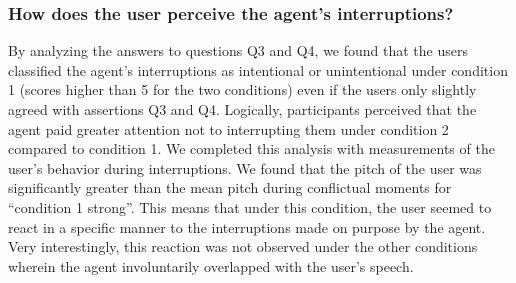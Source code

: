 \documentclass[twocolumn]{svjour3}
\begin{document}
\begin{table}
\centering
{}
\caption{Mean agreements of the participants for conditions 1 and condition 2 (translated from French).}
\label{Answers}
\end{table}

\subsubsection{How does the user perceive the agent's interruptions?}

By analyzing the answers to questions Q3 and Q4, we found that the users classified the agent's interruptions as intentional or unintentional under condition 1 (scores higher than 5 for the two conditions) even if the users only slightly agreed with assertions Q3 and Q4. Logically, participants perceived that the agent paid greater attention not to interrupting them under condition 2 compared to condition 1. 
We completed this analysis with measurements of the user's behavior during interruptions. We found that the pitch of the user was significantly greater than the mean pitch during conflictual moments for ``condition 1 strong''. This means that under this condition, the user seemed to react in a specific manner to the interruptions made on purpose by the agent. Very interestingly, this reaction was not observed under the other conditions wherein the agent involuntarily overlapped with  the user's speech.
\end{document}
